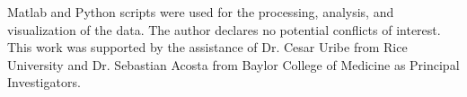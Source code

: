 \documentclass[conference,compsoc]{IEEEtran}
\begin{document}
Matlab and Python scripts were used for the processing, analysis, and visualization of the data. The
author declares no potential conflicts of interest. This work was supported by the assistance of Dr. Cesar Uribe from Rice University and Dr. Sebastian Acosta from Baylor College of Medicine as Principal Investigators.



%
%
%










\end{document}
